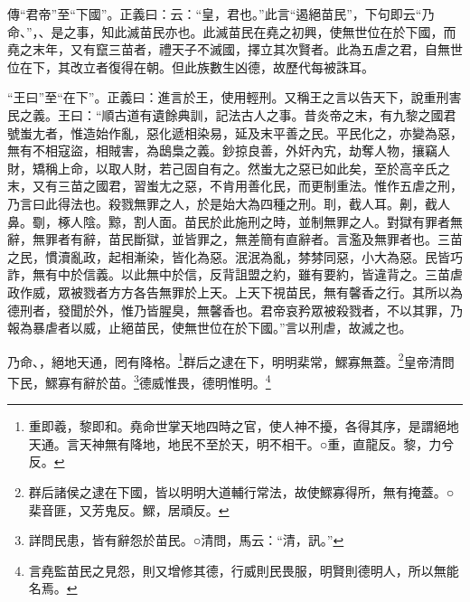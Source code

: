 {\noindent\zhuan{}\fzbyks 傳“君帝”至“下國”。正義曰：云：“皇，君也。”此言“遏絕苗民”，下句即云“乃命、”，、是之事，知此滅苗民亦也。此滅苗民在堯之初興，使無世位在於下國，而堯之末年，又有竄三苗者，禮天子不滅國，擇立其次賢者。此為五虐之君，自無世位在下，其改立者復得在朝。但此族數生凶德，故歷代每被誅耳。 \par}

{\noindent\shu{}\fzkt “王曰”至“在下”。正義曰：進言於王，使用輕刑。又稱王之言以告天下，說重刑害民之義。王曰：“順古道有遺餘典訓，記法古人之事。昔炎帝之末，有九黎之國君號蚩尢者，惟造始作亂，惡化遞相染易，延及末平善之民。平民化之，亦變為惡，無有不相寇盜，相賊害，為鴟梟之義。鈔掠良善，外奸內宄，劫奪人物，攘竊人財，矯稱上命，以取人財，若己固自有之。然蚩尢之惡已如此矣，至於高辛氏之末，又有三苗之國君，習蚩尢之惡，不肯用善化民，而更制重法。惟作五虐之刑，乃言曰此得法也。殺戮無罪之人，於是始大為四種之刑。刵，截人耳。劓，截人鼻。劅，椓人陰。黥，割人面。苗民於此施刑之時，並制無罪之人。對獄有罪者無辭，無罪者有辭，苗民斷獄，並皆罪之，無差簡有直辭者。言濫及無罪者也。三苗之民，慣瀆亂政，起相漸染，皆化為惡。泯泯為亂，棼棼同惡，小大為惡。民皆巧詐，無有中於信義。以此無中於信，反背詛盟之約，雖有要約，皆違背之。三苗虐政作威，眾被戮者方方各告無罪於上天。上天下視苗民，無有馨香之行。其所以為德刑者，發聞於外，惟乃皆腥臭，無馨香也。君帝哀矜眾被殺戮者，不以其罪，乃報為暴虐者以威，止絕苗民，使無世位在於下國。”言以刑虐，故滅之也。 \par}

乃命、，絕地天通，罔有降格。\footnote{重即羲，黎即和。堯命世掌天地四時之官，使人神不擾，各得其序，是謂絕地天通。言天神無有降地，地民不至於天，明不相干。○重，直龍反。黎，力兮反。}群后之逮在下，明明棐常，鰥寡無蓋。\footnote{群后諸侯之逮在下國，皆以明明大道輔行常法，故使鰥寡得所，無有掩蓋。○棐音匪，又芳鬼反。鰥，居頑反。}皇帝清問下民，鰥寡有辭於苗。\footnote{詳問民患，皆有辭怨於苗民。○清問，馬云：“清，訊。”}德威惟畏，德明惟明。\footnote{言堯監苗民之見怨，則又增修其德，行威則民畏服，明賢則德明人，所以無能名焉。}


